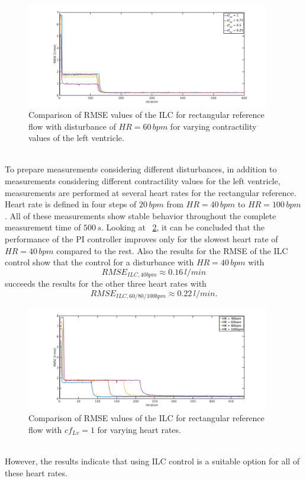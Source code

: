 \begin{figure}[ht!]
  \centering
  \includegraphics[width=0.95\textwidth]{images/chapt_5/ILC/RMSE_dist_square_60_var_cf.pdf}
  \caption[RMSE Comparison of ILC for a rectangular reference flow for varying left ventricular contractilities]{Comparison of RMSE values of the ILC for rectangular reference flow with disturbance of $HR=60\,bpm$ for varying contractility values of the left ventricle.}
  \label{fig:RMSE_dist_square_60_var_cf}
\end{figure}
\\To prepare measurements considering different disturbances, in addition to measurements considering different contractility values for the left ventricle, measurements are performed at several heart rates for the rectangular reference. Heart rate is defined in four steps of $20\,bpm$ from $HR=40\,bpm$ to $HR=100\,bpm$. All of these measurements show stable behavior throughout the complete measurement time of $500\,s$.
Looking at \figurename~\ref{fig:RMSE_dist_square_const_var_hr}, it can be concluded that the performance of the PI controller improves only for the slowest heart rate of $HR=40\,bpm$ compared to the rest. Also the results for the RMSE of the ILC control show that the control for a disturbance with $HR=40\,bpm$ with
\begin{equation}
  RMSE_{ILC,40bpm}\approx 0.16\,l/min
\end{equation}
succeeds the results for the other three heart rates with
\begin{equation}
  RMSE_{ILC,60/80/100bpm}\approx 0.22\,l/min.
\end{equation}
\begin{figure}[ht!]
  \centering
  \includegraphics[width=0.95\textwidth]{images/chapt_5/ILC/RMSE_dist_square_const_var_hr.pdf}
  \caption[RMSE Comparison of ILC at rectangular reference flow for varying heart rates]{Comparison of RMSE values of the ILC for rectangular reference flow with $cf_{Lv}=1$ for varying heart rates.}
  \label{fig:RMSE_dist_square_const_var_hr}
\end{figure}
\\However, the results indicate that using ILC control is a suitable option for all of these heart rates.
